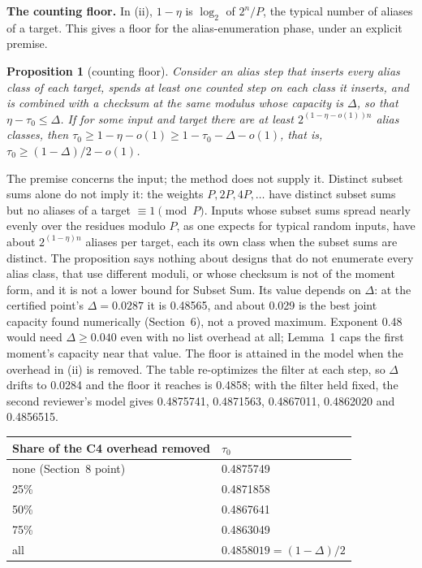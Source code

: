 \documentclass[11pt]{article}
\theoremstyle{plain}
\newtheorem{proposition}{Proposition}
\begin{document}
\textbf{The counting floor.} In (ii), $1 - \eta$ is $\log_2$ of $2^n/P$, the typical number of aliases of a target. This gives a floor for the alias-enumeration phase, under an explicit premise.

\begin{proposition}[counting floor]\label{prop:floor}
Consider an alias step that inserts every alias class of each target, spends at least one counted step on each class it inserts, and is combined with a checksum at the same modulus whose capacity is $\Delta$, so that $\eta - \tau_0 \le \Delta$. If for some input and target there are at least $2^{(1-\eta-o(1))n}$ alias classes, then $\tau_0 \ge 1 - \eta - o(1) \ge 1 - \tau_0 - \Delta - o(1)$, that is, $\tau_0 \ge (1-\Delta)/2 - o(1)$.
\end{proposition}

The premise concerns the input; the method does not supply it. Distinct subset sums alone do not imply it: the weights $P, 2P, 4P, \dots$ have distinct subset sums but no aliases of a target $\equiv 1 \pmod P$. Inputs whose subset sums spread nearly evenly over the residues modulo $P$, as one expects for typical random inputs, have about $2^{(1-\eta)n}$ aliases per target, each its own class when the subset sums are distinct. The proposition says nothing about designs that do not enumerate every alias class, that use different moduli, or whose checksum is not of the moment form, and it is not a lower bound for Subset Sum. Its value depends on $\Delta$: at the certified point's $\Delta = 0.0287$ it is 0.48565, and about 0.029 is the best joint capacity found numerically (Section~6), not a proved maximum. Exponent 0.48 would need $\Delta \ge 0.040$ even with no list overhead at all; Lemma~1 caps the first moment's capacity near that value. The floor is attained in the model when the overhead in (ii) is removed. The table re-optimizes the filter at each step, so $\Delta$ drifts to 0.0284 and the floor it reaches is 0.4858; with the filter held fixed, the second reviewer's model gives 0.4875741, 0.4871563, 0.4867011, 0.4862020 and 0.4856515.

\begin{center}
\small
\begin{tabular}{ll}
\toprule
Share of the C4 overhead removed & $\tau_0$ \\
\midrule
none (Section~8 point) & 0.4875749 \\
25\% & 0.4871858 \\
50\% & 0.4867641 \\
75\% & 0.4863049 \\
all & $0.4858019 = (1 - \Delta)/2$ \\
\bottomrule
\end{tabular}
\end{center}
\end{document}
